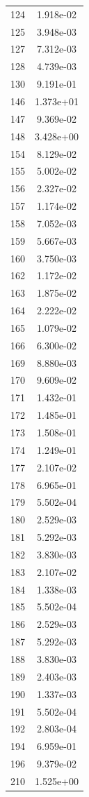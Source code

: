 \documentclass[12pt]{article}
\begin{document}
\begin{longtable}{@{}cc@{}}
124 & 1.918e-02 \\
125 & 3.948e-03 \\
127 & 7.312e-03 \\
128 & 4.739e-03 \\
130 & 9.191e-01 \\
146 & 1.373e+01 \\
147 & 9.369e-02 \\
148 & 3.428e+00 \\
154 & 8.129e-02 \\
155 & 5.002e-02 \\
156 & 2.327e-02 \\
157 & 1.174e-02 \\
158 & 7.052e-03 \\
159 & 5.667e-03 \\
160 & 3.750e-03 \\
162 & 1.172e-02 \\
163 & 1.875e-02 \\
164 & 2.222e-02 \\
165 & 1.079e-02 \\
166 & 6.300e-02 \\
169 & 8.880e-03 \\
170 & 9.609e-02 \\
171 & 1.432e-01 \\
172 & 1.485e-01 \\
173 & 1.508e-01 \\
174 & 1.249e-01 \\
177 & 2.107e-02 \\
178 & 6.965e-01 \\
179 & 5.502e-04 \\
180 & 2.529e-03 \\
181 & 5.292e-03 \\
182 & 3.830e-03 \\
183 & 2.107e-02 \\
184 & 1.338e-03 \\
185 & 5.502e-04 \\
186 & 2.529e-03 \\
187 & 5.292e-03 \\
188 & 3.830e-03 \\
189 & 2.403e-03 \\
190 & 1.337e-03 \\
191 & 5.502e-04 \\
192 & 2.803e-04 \\
194 & 6.959e-01 \\
196 & 9.379e-02 \\
210 & 1.525e+00 \\

\end{longtable}
\end{document}
